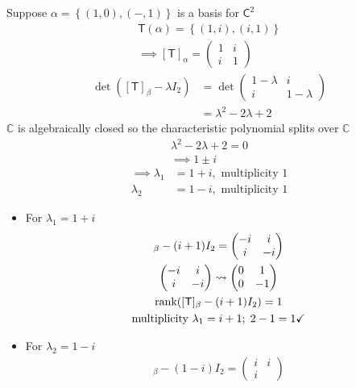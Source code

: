 \begin{enumerate}
Suppose $\alpha = \left\{(1,0),(-,1) \right\}$ is a basis for $\mathsf{C}^2$
\begin{gather}
\mathsf{T}(\alpha) = \left\{(1,i),(i,1)\right \}\\
\implies [\mathsf{T}]_\alpha = \begin{pmatrix}
1 & i\\
i & 1
\end{pmatrix}
\end{gather}
\begin{align}
\det{([\mathsf{T}]_\beta -\lambda I_2)} &= \det{\begin{pmatrix}
1-\lambda & i\\
i & 1-\lambda 
\end{pmatrix}
}\\
&= \lambda^2-2\lambda +2
\end{align}
$\mathbb{C}$ is algebraically closed so the characteristic polynomial
splits over $\mathbb{C}$
\begin{gather}
\lambda^2-2\lambda +2 =0 \\
\implies 1\pm i
\end{gather}
\begin{align}
\implies \lambda_1 &= 1+i, \text{ multiplicity } 1\\
\lambda_2 &= 1-i, \text{ multiplicity } 1 
\end{align}
\begin{itemize}
\item For $\lambda_1 = 1 +i$
\begin{gather}
[\mathsf{T}]_\beta -(i+1)I_2 = \begin{pmatrix}
-i & i\\
i & -i
\end{pmatrix}\\
\begin{pmatrix}
-i & i\\
i & -i
\end{pmatrix}
\leadsto
\begin{pmatrix}
0 & 1\\
0 & -1
\end{pmatrix}\\
\rank{[\mathsf{T}]_\beta -(i+1)I_2} =1\\
\text{multiplicity } \lambda_1 =i+1; \; 2-1 =1 \checkmark
\end{gather}
\item For $\lambda_2 = 1 -i$
\begin{gather}
[\mathsf{T}]_\beta - (1-i)I_2 = \begin{pmatrix} i & i \\ i &

\end{pmatrix}
\end{gather}
\end{itemize}
\end{enumerate}
